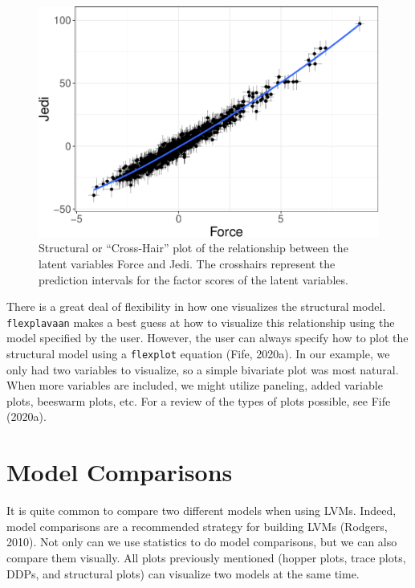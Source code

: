 \documentclass[
  english,
  doc]{apa6}
\begin{document}
\begin{figure}
\centering
\includegraphics{flexplavaan_draft_files/figure-latex/beech-1.pdf}
\caption{\label{fig:beech}Structural or ``Cross-Hair'' plot of the relationship between the latent variables Force and Jedi. The crosshairs represent the prediction intervals for the factor scores of the latent variables.}
\end{figure}

There is a great deal of flexibility in how one visualizes the structural model. \texttt{flexplavaan} makes a best guess at how to visualize this relationship using the model specified by the user. However, the user can always specify how to plot the structural model using a \texttt{flexplot} equation (Fife, 2020a). In our example, we only had two variables to visualize, so a simple bivariate plot was most natural. When more variables are included, we might utilize paneling, added variable plots, beeswarm plots, etc. For a review of the types of plots possible, see Fife (2020a).

\hypertarget{model-comparisons}{%
\section{Model Comparisons}\label{model-comparisons}}

It is quite common to compare two different models when using LVMs. Indeed, model comparisons are a recommended strategy for building LVMs (Rodgers, 2010). Not only can we use statistics to do model comparisons, but we can also compare them visually. All plots previously mentioned (hopper plots, trace plots, DDPs, and structural plots) can visualize two models at the same time.
\end{document}
